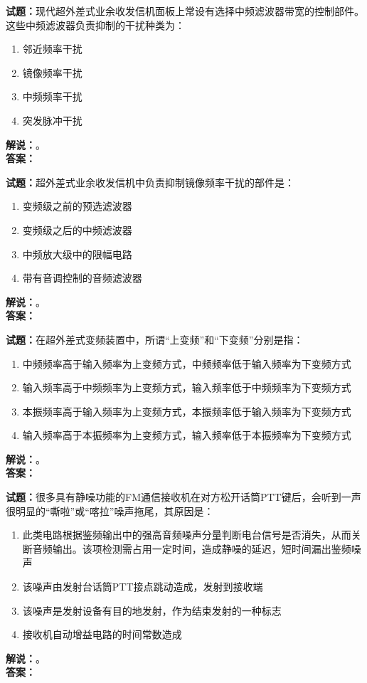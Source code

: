 \documentclass{ctexbook}
\begin{document}
\bigskip




\noindent\textbf{试题：}现代超外差式业余收发信机面板上常设有选择中频滤波器带宽的控制部件。这些中频滤波器负责抑制的干扰种类为：
\begin{enumerate}[leftmargin=3em]
\item 邻近频率干扰
\item 镜像频率干扰
\item 中频频率干扰
\item 突发脉冲干扰
\end{enumerate}
\noindent\textbf{解说：}\textbf{}。\\\noindent\textbf{答案：}

\bigskip




\noindent\textbf{试题：}超外差式业余收发信机中负责抑制镜像频率干扰的部件是：
\begin{enumerate}[leftmargin=3em]
\item 变频级之前的预选滤波器
\item 变频级之后的中频滤波器
\item 中频放大级中的限幅电路
\item 带有音调控制的音频滤波器
\end{enumerate}
\noindent\textbf{解说：}\textbf{}。\\\noindent\textbf{答案：}

\bigskip




\noindent\textbf{试题：}在超外差式变频装置中，所谓“上变频”和“下变频”分别是指：
\begin{enumerate}[leftmargin=3em]
\item 中频频率高于输入频率为上变频方式，中频频率低于输入频率为下变频方式
\item 输入频率高于中频频率为上变频方式，输入频率低于中频频率为下变频方式
\item 本振频率高于输入频率为上变频方式，本振频率低于输入频率为下变频方式
\item 输入频率高于本振频率为上变频方式，输入频率低于本振频率为下变频方式
\end{enumerate}
\noindent\textbf{解说：}\textbf{}。\\\noindent\textbf{答案：}

\bigskip




\noindent\textbf{试题：}很多具有静噪功能的FM通信接收机在对方松开话筒PTT键后，会听到一声很明显的“嘶啦”或“喀拉”噪声拖尾，其原因是：
\begin{enumerate}[leftmargin=3em]
\item 此类电路根据鉴频输出中的强高音频噪声分量判断电台信号是否消失，从而关断音频输出。该项检测需占用一定时间，造成静噪的延迟，短时间漏出鉴频噪声
\item 该噪声由发射台话筒PTT接点跳动造成，发射到接收端
\item 该噪声是发射设备有目的地发射，作为结束发射的一种标志
\item 接收机自动增益电路的时间常数造成
\end{enumerate}
\noindent\textbf{解说：}\textbf{}。\\\noindent\textbf{答案：}
\end{document}
